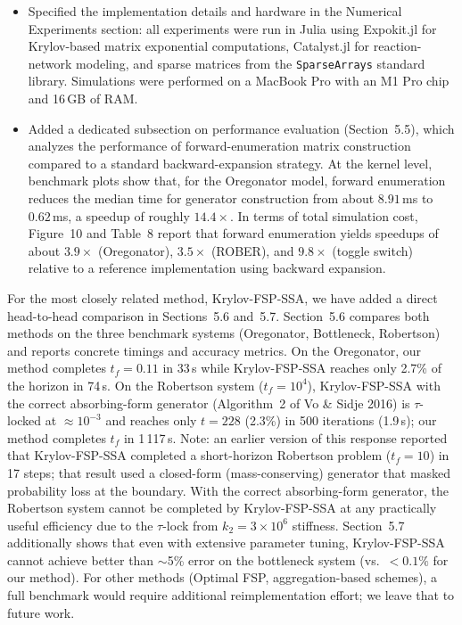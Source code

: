 \documentclass[11pt]{article}
\begin{document}
\begin{itemize}
  \item Specified the implementation details and hardware in the Numerical
        Experiments section: all experiments were run in Julia using Expokit.jl
        for Krylov-based matrix exponential computations, Catalyst.jl for
        reaction-network modeling, and sparse matrices from the
        \texttt{SparseArrays} standard library. Simulations were performed on a
        MacBook Pro with an M1 Pro chip and 16\,GB of RAM.
  \item Added a dedicated subsection on performance evaluation (Section~5.5), which
        analyzes the performance of forward-enumeration matrix construction
        compared to a standard backward-expansion strategy. At the kernel level,
        benchmark plots show that, for the Oregonator model, forward enumeration
        reduces the median time for generator construction from about
        $8.91$\,ms to $0.62$\,ms, a speedup of roughly $14.4\times$. In terms of
        total simulation cost, Figure~10 and Table~8 report that forward
        enumeration yields speedups of about $3.9\times$ (Oregonator),
        $3.5\times$ (ROBER), and $9.8\times$ (toggle switch) relative to a
        reference implementation using backward expansion.
\end{itemize}

For the most closely related method, Krylov-FSP-SSA, we have added a direct
head-to-head comparison in Sections~5.6 and~5.7. Section~5.6 compares both methods
on the three benchmark systems (Oregonator, Bottleneck, Robertson) and reports
concrete timings and accuracy metrics. On the Oregonator, our method completes $t_f = 0.11$ in 33\,s
while Krylov-FSP-SSA reaches only 2.7\% of the horizon in 74\,s. On the Robertson
system ($t_f = 10^4$), Krylov-FSP-SSA with the correct absorbing-form generator
(Algorithm~2 of Vo \& Sidje 2016) is $\tau$-locked at ${\approx}10^{-3}$ and reaches
only $t = 228$ (2.3\%) in 500 iterations (1.9\,s); our method completes $t_f$ in
1\,117\,s. Note: an earlier version of this response reported that Krylov-FSP-SSA
completed a short-horizon Robertson problem ($t_f = 10$) in 17 steps; that result
used a closed-form (mass-conserving) generator that masked probability loss at the
boundary. With the correct absorbing-form generator, the Robertson system cannot be
completed by Krylov-FSP-SSA at any practically useful efficiency due to the
$\tau$-lock from $k_2 = 3\times10^6$ stiffness. Section~5.7 additionally shows that
even with extensive parameter tuning, Krylov-FSP-SSA cannot achieve better than
$\sim$5\% error on the bottleneck system (vs.\ $<0.1\%$ for our method). For other
methods (Optimal FSP, aggregation-based schemes), a full benchmark would require
additional reimplementation effort; we leave that to future work.
\end{document}
